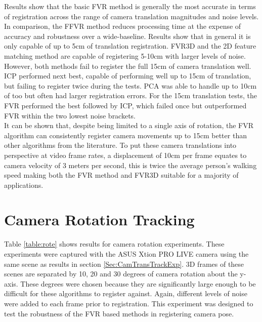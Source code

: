 Results show that the basic FVR method is generally the most accurate in terms of registration across the range of camera translation magnitudes and noise levels. In comparison, the FFVR method reduces processing time at the expense of accuracy and robustness over a wide-baseline. Results show that in general it is only capable of up to 5cm of translation registration. FVR3D and the 2D feature matching method are capable of registering 5-10cm with larger levels of noise. However, both methods fail to register the full 15cm of camera translation well. \\

ICP performed next best, capable of performing well up to 15cm of translation, but failing to register twice during the tests. PCA was able to handle up to 10cm of too but often had larger registration errors. For the 15cm translation tests, the FVR performed the best followed by ICP, which failed once but outperformed FVR within the two lowest noise brackets. \\


It can be shown that, despite being limited to a single axis of rotation, the FVR algorithm can consistently register camera movements up to 15cm better than other algorithms from the literature. To put these camera translations into perspective at video frame rates, a displacement of 10cm per frame equates to camera velocity of 3 meters per second, this is twice the average person's walking speed making both the FVR method and FVR3D suitable for a majority of applications. \\


\section{Camera Rotation Tracking}
\label{Sec:CamRoteTrackExp}

Table \ref{table:rote} shows results for camera rotation experiments. These experiments were captured with the ASUS Xtion PRO LIVE camera using the same scene as results in section \ref{Sec:CamTransTrackExp}. 3D frames of these scenes are separated by 10, 20 and 30 degrees of camera rotation about the y-axis. These degrees were chosen because they are significantly large enough to be difficult for these algorithms to register against. Again, different levels of noise were added to each frame prior to registration. This experiment was designed to test the robustness of the FVR based methods in registering camera pose. \\


